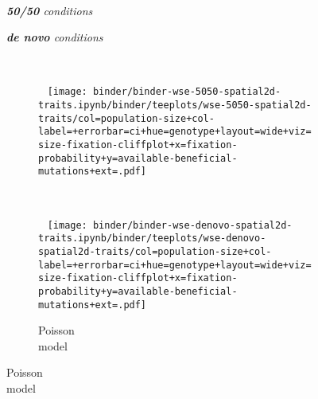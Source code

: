\begin{figure}[h]
  \captionsetup[subfigure]{justification=raggedright}
  \begin{minipage}{\textwidth}

    \begin{minipage}{0.1\textwidth}~\end{minipage}%
    \begin{minipage}{0.35\textwidth}
      \centering
      \itshape
      {\large
      \textbf{50/50} conditions
      }
    \end{minipage}%
    \begin{minipage}{0.45\textwidth}
      \centering
      \itshape
      {\large
      \textbf{de novo} conditions
      }
    \end{minipage}

    ~\vspace{-0.7ex}

    \begin{subfigure}[b]{\linewidth}
        \begin{minipage}{0.42\textwidth}
          ~
          \texttt{[image: binder/binder-wse-5050-spatial2d-traits.ipynb/binder/teeplots/wse-5050-spatial2d-traits/col=population-size+col-label=+errorbar=ci+hue=genotype+layout=wide+viz=size-fixation-cliffplot+x=fixation-probability+y=available-beneficial-mutations+ext=.pdf]}%
        \end{minipage}%
        \begin{minipage}{0.06\textwidth}
          ~
        \end{minipage}%
        \begin{minipage}{0.38\textwidth}
          ~
          \texttt{[image: binder/binder-wse-denovo-spatial2d-traits.ipynb/binder/teeplots/wse-denovo-spatial2d-traits/col=population-size+col-label=+errorbar=ci+hue=genotype+layout=wide+viz=size-fixation-cliffplot+x=fixation-probability+y=available-beneficial-mutations+ext=.pdf]}%
        \end{minipage}%
      \begin{minipage}{0.12\textwidth}
        \raggedright
        \large
        \caption{Poisson\\ model}
        \label{fig:spatial-structure:5050}
        \vspace{20ex}
      \end{minipage}%
    \end{subfigure}%


\end{minipage}
\end{figure}
